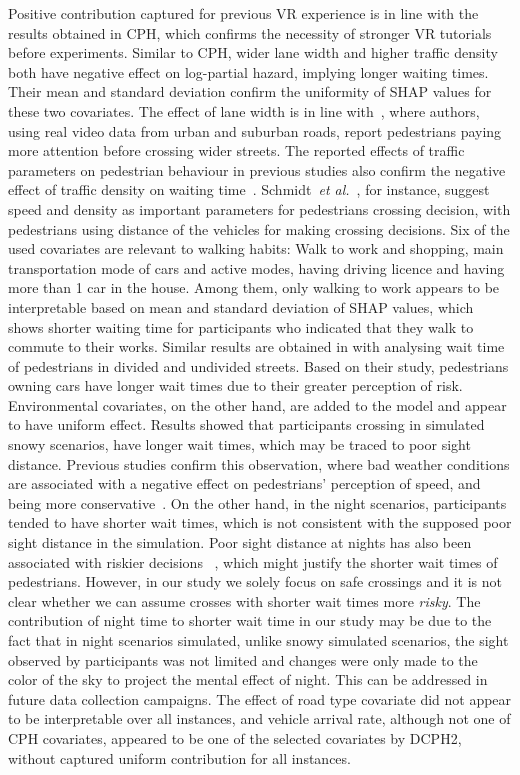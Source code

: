 Positive contribution captured for previous VR experience is in line with the results obtained in CPH, which confirms the necessity of stronger VR tutorials before experiments. Similar to CPH, wider lane width and higher traffic density both have negative effect on log-partial hazard, implying longer waiting times. Their mean and standard deviation confirm the uniformity of SHAP values for these two covariates. The effect of lane width is in line with~\citep{rasouli2017agreeing}, where authors, using real video data from urban and suburban roads, report pedestrians paying more attention before crossing wider streets. The reported effects of traffic parameters on pedestrian behaviour in previous studies also confirm the negative effect of traffic density on waiting time~\citep{schmidt2009pedestrians,ishaque2008behavioural}. Schmidt~\textit{et al.}~\cite{schmidt2009pedestrians}, for instance, suggest speed and density as important parameters for pedestrians crossing decision, with pedestrians using distance of the vehicles for making crossing decisions.
Six of the used covariates are relevant to walking habits: Walk to work and shopping, main transportation mode of cars and active modes, having driving licence and having more than 1 car in the house. Among them, only walking to work appears to be interpretable based on mean and standard deviation of SHAP values, which shows shorter waiting time for participants who indicated that they walk to commute to their works. Similar results are obtained in \citep{hamed2001analysis} with analysing wait time of pedestrians in divided and undivided streets. Based on their study, pedestrians owning cars have longer wait times due to their greater perception of risk. 
Environmental covariates, on the other hand, are added to the model and appear to have uniform effect. Results showed that participants crossing in simulated snowy scenarios, have longer wait times, which may be traced to poor sight distance. Previous studies confirm this observation, where bad weather conditions are associated with a negative effect on pedestrians' perception of speed, and being more conservative~\citep{rasouli2019autonomous,sun2015estimation,harrell1991factors}. On the other hand, in the night scenarios, participants tended to have shorter wait times, which is not consistent with the supposed poor sight distance in the simulation. Poor sight distance at nights has also been associated with riskier decisions ~\citep{rasouli2019autonomous}, which might justify the shorter wait times of pedestrians. However, in our study we solely focus on safe crossings and it is not clear whether we can assume crosses with shorter wait times more \textit{risky}. The contribution of night time to shorter wait time in our study may be due to the fact that in night scenarios simulated, unlike snowy simulated scenarios, the sight observed by participants was not limited and changes were only made to the color of the sky to project the mental effect of night. This can be addressed in future data collection campaigns. 
The effect of road type covariate did not appear to be interpretable over all instances, and vehicle arrival rate, although not one of CPH covariates, appeared to be one of the selected covariates by DCPH2, without captured uniform contribution for all instances. 

